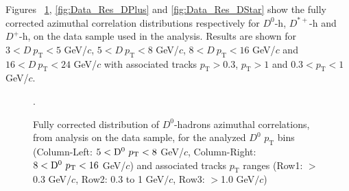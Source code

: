 \begin{comment}
\begin{figure}[h]
\centering
 \caption{Corrected azimuthal correlation 2D plots in different $\text{D}^+$ $\text{p}_T$ regions. Left: $5< p_{T}^{\text{D}^+}< 8 GeV/c$ , High: $8< p_{T}^{\text{D}^+}< 16 GeV/c$  for associated $p_\text{T}$ range 0.3 - 1.0 GeV/$c$}
\label{fig:Dpluscorr2D_newpT}
\end{figure}
\end{comment}

Figures ~\ref{fig:Data_Res_D0}, \ref{fig:Data_Res_DPlus}  and \ref{fig:Data_Res_DStar} show the fully corrected azimuthal correlation distributions respectively for $D^0$-h, $D^{*+}$-h and $D^+$-h, on the data sample used in the analysis. Results are shown for $3 < D\ p_\text{T} < 5$ GeV/$c$, $5 < D\ p_\text{T} < 8$ GeV/$c$, $8 < D \ p_\text{T} < 16$ GeV/$c$ and $16 < D\ p_\text{T} < 24$ GeV/$c$ with associated tracks $p_\text{T} > 0.3$, $p_\text{T} > 1$ and $0.3 < p_\text{T} < 1$ GeV/$c$.

\begin{figure}[h]
\centering
\caption{Fully corrected distribution of $D^0$-hadrons azimuthal correlations, from analysis on the data sample, for the analyzed $D^0$ $p_\text{T}$ bins (Column-Left: $5 < {\rm D^0} \ p_\text{T} < 8$ GeV/$c$, Column-Right: $8 < {\rm D^0} \ p_\text{T} < 16$ GeV/$c$) and associated tracks $p_\text{T}$ ranges (Row1: $>$0.3 GeV$/c$, Row2: 0.3 to 1 GeV$/c$, Row3: $>$1.0 GeV$/c$)}.
\label{fig:Data_Res_D0}
\end{figure}

